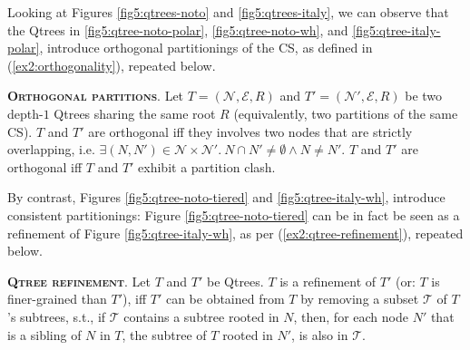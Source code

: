Looking at Figures \ref{fig5:qtrees-noto} and \ref{fig5:qtrees-italy}, we can observe that the Qtrees in \ref{fig5:qtree-noto-polar}, \ref{fig5:qtree-noto-wh}, and \ref{fig5:qtree-italy-polar}, introduce orthogonal partitionings of the CS, as defined in (\ref{ex2:orthogonality}), repeated below. 

\begin{exe}
	 {\textsc{\textbf{Orthogonal partitions}}. Let $T = (\mathcal{N}, \mathcal{E}, R)$ and $T' = (\mathcal{N}', \mathcal{E}, R)$ be two depth-$1$ Qtrees sharing the same root $R$ (equivalently, two partitions of the same CS). $T$ and $T'$ are orthogonal iff they involves two nodes that are strictly overlapping, i.e. $\exists (N, N') \in \mathcal{N}\times\mathcal{N'}. \ N \cap N' \neq \emptyset \wedge N \neq N'$. $T$ and $T'$ are orthogonal iff $T$ and $T'$ exhibit a partition clash.}
\end{exe}


By contrast, Figures \ref{fig5:qtree-noto-tiered} and \ref{fig5:qtree-italy-wh}, introduce consistent partitionings: Figure \ref{fig5:qtree-noto-tiered} can be in fact be seen as a refinement of Figure \ref{fig5:qtree-italy-wh}, as per (\ref{ex2:qtree-refinement}), repeated below.

\begin{exe}
	 {\textsc{\textbf{Qtree refinement}}. Let $T$ and $T'$ be Qtrees. $T$ is a refinement of $T'$ (or: $T$ is finer-grained than $T'$), iff $T'$ can be obtained from $T$ by removing a subset $\mathcal{T}$ of $T$'s subtrees, s.t., if $\mathcal{T}$ contains a subtree rooted in $N$, then, for each node $N'$ that is a sibling of $N$ in $T$, the subtree of $T$ rooted in $N'$, is also in $\mathcal{T}$.}
\end{exe}


	
